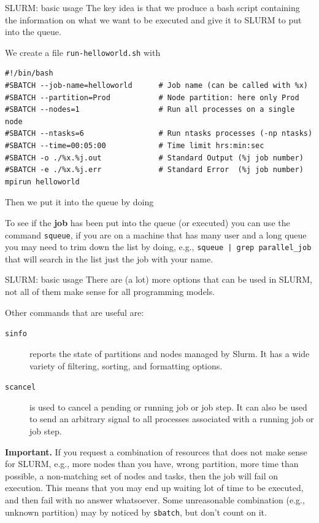 \documentclass[xcolor={svgnames,usenames}]{beamer}
\begin{document}
\begin{frame}[fragile]{SLURM: basic usage}\vspace{-1em}
The \alert{key idea} is that we produce a bash script containing the information on what we want to be executed and give it to SLURM to put into the queue.

We create a file \verb|run-helloworld.sh| with
\begin{verbatim}
#!/bin/bash
#SBATCH --job-name=helloworld      # Job name (can be called with %x)
#SBATCH --partition=Prod           # Node partition: here only Prod
#SBATCH --nodes=1                  # Run all processes on a single node
#SBATCH --ntasks=6                 # Run ntasks processes (-np ntasks)
#SBATCH --time=00:05:00            # Time limit hrs:min:sec
#SBATCH -o ./%x.%j.out             # Standard Output (%j job number)
#SBATCH -e ./%x.%j.err             # Standard Error  (%j job number)
mpirun helloworld
\end{verbatim}

Then we put it into the queue by doing 

To see if the \textbf{job} has been put into the queue (or executed) you can use the command \texttt{squeue}, if you are on a machine that has many user and a long queue you may need to trim down the list by doing, e.g., \texttt{squeue | grep parallel_job} that will search in the list just the job with your name.

\end{frame}

\begin{frame}{SLURM: basic usage}
There are (a lot) more options that can be used in SLURM, not all of them make sense for all programming models.

Other commands that are useful are:
\begin{description}
	\item[{\texttt{sinfo}}] reports the state of partitions and nodes managed by Slurm. It has a wide variety of filtering, sorting, and formatting options.
	\item[{\texttt{scancel}}] is used to cancel a pending or running job or job step. It can also be used to send an arbitrary signal to all processes associated with a running job or job step.
\end{description}

\textbf{Important.} If you request a combination of resources that does not make sense for SLURM, e.g., more nodes than you have, wrong partition, more time than possible, a non-matching set of nodes and tasks, then \alert{the job will fail on execution}. This means that you may end up waiting lot of time to be executed, and then fail with no answer whatsoever. Some unreasonable combination (e.g., unknown partition) may by noticed by \texttt{sbatch}, but don't count on it.

\end{frame}
\end{document}
